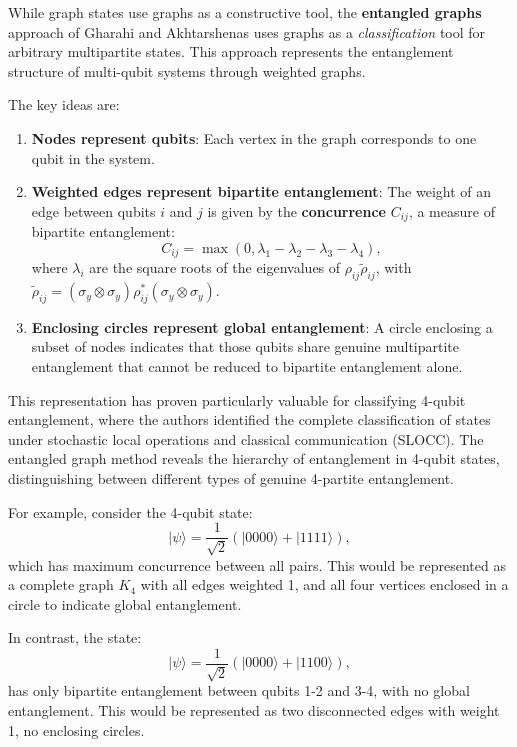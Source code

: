 \documentclass[12pt,a4paper]{article}
\begin{document}
While graph states use graphs as a constructive tool, the \textbf{entangled graphs} approach of Gharahi and Akhtarshenas \cite{EntangledGraphs,Gharahi2016} uses graphs as a \emph{classification} tool for arbitrary multipartite states. This approach represents the entanglement structure of multi-qubit systems through weighted graphs.

The key ideas are:
\begin{enumerate}
	\item \textbf{Nodes represent qubits}: Each vertex in the graph corresponds to one qubit in the system.
	\item \textbf{Weighted edges represent bipartite entanglement}: The weight of an edge between qubits $i$ and $j$ is given by the \textbf{concurrence} $C_{ij}$, a measure of bipartite entanglement:
	      \begin{equation}
		      C_{ij} = \max(0, \lambda_1 - \lambda_2 - \lambda_3 - \lambda_4),
	      \end{equation}
	      where $\lambda_i$ are the square roots of the eigenvalues of $\rho_{ij}\tilde{\rho}_{ij}$, with $\tilde{\rho}_{ij} = (\sigma_y \otimes \sigma_y) \rho_{ij}^* (\sigma_y \otimes \sigma_y)$.
	\item \textbf{Enclosing circles represent global entanglement}: A circle enclosing a subset of nodes indicates that those qubits share genuine multipartite entanglement that cannot be reduced to bipartite entanglement alone.
\end{enumerate}

This representation has proven particularly valuable for classifying 4-qubit entanglement, where the authors identified the complete classification of states under stochastic local operations and classical communication (SLOCC). The entangled graph method reveals the hierarchy of entanglement in 4-qubit states, distinguishing between different types of genuine 4-partite entanglement.

For example, consider the 4-qubit state:
\begin{equation}
	|\psi\rangle = \frac{1}{\sqrt{2}}(|0000\rangle + |1111\rangle),
\end{equation}
which has maximum concurrence between all pairs. This would be represented as a complete graph $K_4$ with all edges weighted 1, and all four vertices enclosed in a circle to indicate global entanglement.

In contrast, the state:
\begin{equation}
	|\psi\rangle = \frac{1}{\sqrt{2}}(|0000\rangle + |1100\rangle),
\end{equation}
has only bipartite entanglement between qubits 1-2 and 3-4, with no global entanglement. This would be represented as two disconnected edges with weight 1, no enclosing circles.
\end{document}
